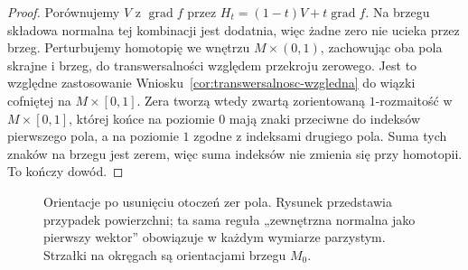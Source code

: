 \begin{proof}
Porównujemy $V$ z $\operatorname{grad}f$ przez
$H_t=(1-t)V+t\operatorname{grad}f$.
Na brzegu składowa normalna tej kombinacji jest dodatnia,
więc żadne zero nie ucieka przez brzeg.
Perturbujemy homotopię
we wnętrzu $M\times(0,1)$,
zachowując oba pola skrajne i brzeg,
do transwersalności
względem przekroju zerowego.
Jest to względne zastosowanie
Wniosku~\ref{cor:transwersalnosc-wzgledna}
do wiązki cofniętej na $M\times[0,1]$.
Zera tworzą wtedy zwartą zorientowaną
$1$-rozmaitość w $M\times[0,1]$,
której końce na poziomie $0$ mają
znaki przeciwne do indeksów pierwszego
pola, a na poziomie $1$ zgodne
z indeksami drugiego pola.
Suma tych znaków na brzegu jest zerem,
więc suma indeksów nie zmienia się
przy homotopii. To kończy dowód.
\end{proof}

\begin{figure}[H]
\centering
{}
\caption{Orientacje po usunięciu otoczeń zer pola.
Rysunek przedstawia przypadek powierzchni; ta sama reguła
„zewnętrzna normalna jako pierwszy wektor” obowiązuje
w każdym wymiarze parzystym.
Strzałki na okręgach są orientacjami brzegu $M_0$.}
\label{fig:CGB-dziury-orientacja}
\end{figure}

